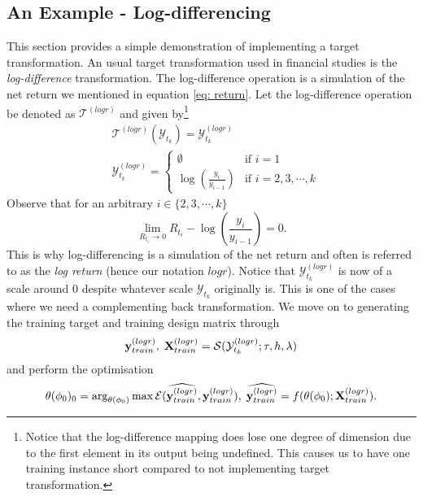 \subsection{An Example - Log-differencing}
This section provides a simple demonstration of implementing a target transformation. An usual target transformation used in financial studies is the \textit{log-difference} transformation. The log-difference operation is a simulation of the net return we mentioned in equation \ref{eq: return}. Let the log-difference operation be denoted as $\mathcal{T}^{(logr)}$ and given by\footnote{Notice that the log-difference mapping does lose one degree of dimension due to the first element in its output being undefined. This causes us to have one training instance short compared to not implementing target transformation.}
\begin{align*}
    &\mathcal{T}^{(logr)}(\mathcal{Y}_{t_k}) = \mathcal{Y}^{(logr)}_{t_k} \\
    &\mathcal{Y}^{(logr)}_{t_k} = \begin{cases}
        \emptyset                  &\text{if $i = 1$} \\
        \log(\frac{y_i}{y_{i-1}})  &\text{if $i = 2, 3, \cdots, k$}
    \end{cases}
\end{align*}
Observe that for an arbitrary $i \in \{2, 3, \cdots, k \}$
\begin{equation*}
    \lim_{R_{t_i} \rightarrow 0}{R_{t_i} - \log(\frac{y_i}{y_{i-1}}) = 0}.
\end{equation*}
This is why log-differencing is a simulation of the net return and often is referred to as the \textit{log return} (hence our notation $logr$). Notice that $\mathcal{Y}^{(logr)}_{t_k}$ is now of a scale around $0$ despite whatever scale $\mathcal{Y}_{t_k}$ originally is. This is one of the cases where we need a complementing back transformation. We move on to generating the training target and training design matrix through
\begin{equation*}
    \mathbf{y}^{(logr)}_{train}, \; \mathbf{X}^{(logr)}_{train} = \mathcal{S}(\mathcal{Y}^{(logr)}_{t_k}; \tau, h, \lambda)
\end{equation*}
and perform the optimisation
\begin{equation*}
    \theta(\phi_0)_0 = \arg_{\theta(\phi_0)} \max \mathcal{E}(\widehat{\mathbf{y}^{(logr)}_{train}}, \mathbf{y}^{(logr)}_{train}), \; \widehat{\mathbf{y}^{(logr)}_{train}} = f(\theta(\phi_0); \mathbf{X}^{(logr)}_{train}).
\end{equation*}
